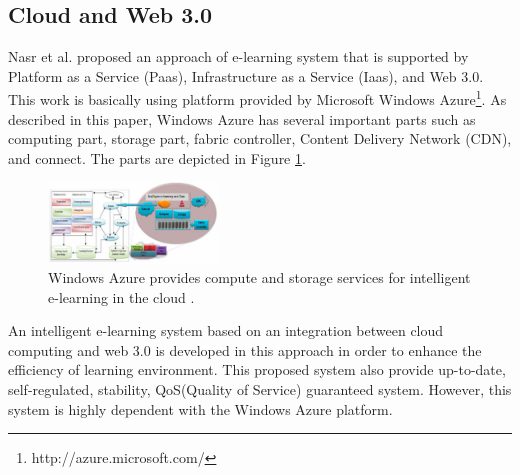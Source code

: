 \documentclass[journal]{vgtc}
\begin{document}
  
  \subsection{Cloud and Web 3.0}

  Nasr et al. \cite{nasr2012proposed} proposed an approach of e-learning system that is supported by Platform as a Service (Paas), Infrastructure as a Service (Iaas), and Web 3.0. This work is basically using platform provided by Microsoft Windows Azure\footnote{http://azure.microsoft.com/}. As described in this paper, Windows Azure has several important parts such as computing part, storage part, fabric controller, Content Delivery Network (CDN), and connect. The parts are depicted in Figure \ref{win-azure}.

  \begin{figure}[t]
    \centering
    \includegraphics[width=0.4\textwidth]{win-azure}
    \caption{Windows Azure provides compute and storage services for intelligent e-learning in the cloud \cite{nasr2012proposed}.}
    \label{win-azure}
  \end{figure}

  An intelligent e-learning system based on an integration between cloud computing and web 3.0 is developed in this approach in order to enhance the efficiency of learning environment. This proposed system also provide up-to-date, self-regulated, stability, QoS(Quality of Service) guaranteed system. However, this system is highly dependent with the Windows Azure platform.
\end{document}
